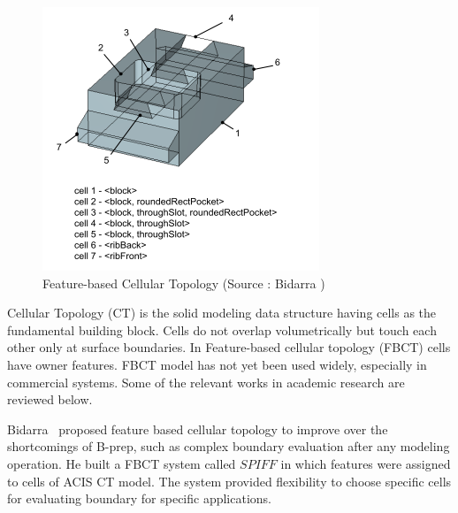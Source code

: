 
 \begin{figure}[!h]
\centering     %
\includegraphics[width=0.62\linewidth,valign=t]{../Common/images/fbct}
\caption{Feature-based Cellular Topology (Source : Bidarra \cite{Bidarra2003a})}
\label{fig:litsurvey:fbct}
\end{figure}



Cellular Topology (CT) is the solid modeling data structure having cells as the fundamental building block. Cells do not overlap volumetrically but touch each other only at surface boundaries. In Feature-based cellular topology (FBCT) cells have owner features. FBCT model has not yet been used widely, especially in commercial systems. Some of the relevant works in academic research are reviewed below. 

Bidarra~\cite{Bidarra1993, Bidarra1997, BidarraKrakerBronsvoort1998} proposed feature based cellular topology to improve over the shortcomings of B-prep, such as complex boundary evaluation after any modeling operation. He built a FBCT system called $SPIFF$ in which features were assigned to cells of ACIS CT model. The system provided flexibility to choose specific cells for evaluating boundary for specific applications.

